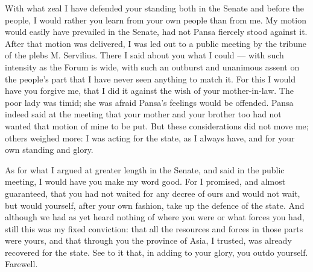 

 With what zeal I have defended your standing both in the Senate and before the people, I would rather you learn from your own people than from me. My motion would easily have prevailed in the Senate, had not Pansa fiercely stood against it. After that motion was delivered, I was led out to a public meeting by the tribune of the plebs M. Servilius. There I said about you what I could --- with such intensity as the Forum is wide, with such an outburst and unanimous assent on the people's part that I have never seen anything to match it. For this I would have you forgive me, that I did it against the wish of your mother-in-law. The poor lady was timid; she was afraid Pansa's feelings would be offended. Pansa indeed said at the meeting that your mother and your brother too had not wanted that motion of mine to be put. But these considerations did not move me; others weighed more: I was acting for the state, as I always have, and for your own standing and glory.

 As for what I argued at greater length in the Senate, and said in the public meeting, I would have you make my word good. For I promised, and almost guaranteed, that you had not waited for any decree of ours and would not wait, but would yourself, after your own fashion, take up the defence of the state. And although we had as yet heard nothing of where you were or what forces you had, still this was my fixed conviction: that all the resources and forces in those parts were yours, and that through you the province of Asia, I trusted, was already recovered for the state. See to it that, in adding to your glory, you outdo yourself. Farewell.
